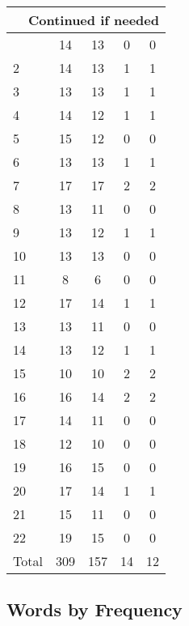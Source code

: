 \begin{center}
\begin{longtable}{l|c|c|c|c}
\hline \multicolumn{5}{|r|}{{Continued if needed}} \\ \hline
\endfoot 
1 & 14 & 13 & 0 & 0\\ \hline
2 & 14 & 13 & 1 & 1\\ \hline
3 & 13 & 13 & 1 & 1\\ \hline
4 & 14 & 12 & 1 & 1\\ \hline
5 & 15 & 12 & 0 & 0\\ \hline
6 & 13 & 13 & 1 & 1\\ \hline
7 & 17 & 17 & 2 & 2\\ \hline
8 & 13 & 11 & 0 & 0\\ \hline
9 & 13 & 12 & 1 & 1\\ \hline
10 & 13 & 13 & 0 & 0\\ \hline
11 & 8 & 6 & 0 & 0\\ \hline
12 & 17 & 14 & 1 & 1\\ \hline
13 & 13 & 11 & 0 & 0\\ \hline
14 & 13 & 12 & 1 & 1\\ \hline
15 & 10 & 10 & 2 & 2\\ \hline
16 & 16 & 14 & 2 & 2\\ \hline
17 & 14 & 11 & 0 & 0\\ \hline
18 & 12 & 10 & 0 & 0\\ \hline
19 & 16 & 15 & 0 & 0\\ \hline
20 & 17 & 14 & 1 & 1\\ \hline
21 & 15 & 11 & 0 & 0\\ \hline
22 & 19 & 15 & 0 & 0\\ \hline
\hline \hline
Total & 309 & 157 & 14 & 12




\end{longtable}
\end{center}



\subsection{Words by Frequency}
 
